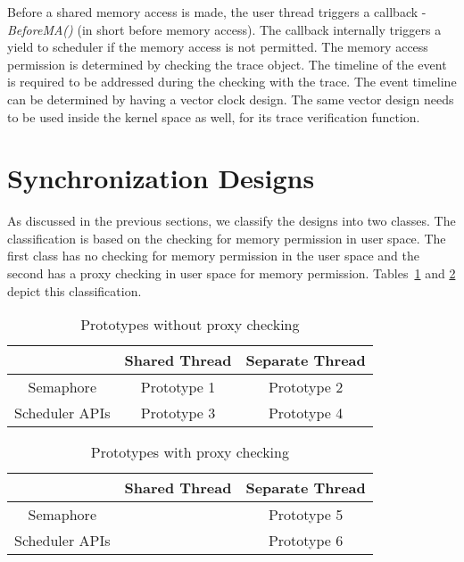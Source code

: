Before a shared memory access is made, the user thread triggers a callback - \emph{BeforeMA()} (in short before memory access). 
The callback internally triggers a yield to scheduler if the memory access is not permitted. 
The memory access permission is determined by checking the trace object. 
The timeline of the event is required to be addressed during the checking with the trace. 
The event timeline can be determined by having a vector clock design. 
The same vector design needs to be used inside the kernel space as well, for its trace verification function.



\section{Synchronization Designs \label{sync_des}}

As discussed in the previous sections, we classify the designs into two classes. 
The classification is based on the checking for memory permission in user space. 
The first class has no checking for memory permission in the user space and the second has a proxy checking in user space for memory permission. 
Tables~\ref{protos_without_proxy} and \ref{protos_with_proxy} depict this classification.

\begin{table}[h]
\begin{center}
 \begin{tabular}{|c c c|} 
 \hline
 & Shared Thread & Separate Thread\\ %
 \hline
Semaphore & Prototype 1 & Prototype 2\\
Scheduler APIs & Prototype 3 & Prototype 4\\
\hline
\end{tabular}
\end{center}
\caption{Prototypes without proxy checking}
\label{protos_without_proxy}
\end{table}

\begin{table}[h]
\begin{center}
 \begin{tabular}{|c c c|} 
 \hline
 & Shared Thread & Separate Thread\\ %
 \hline
Semaphore &  & Prototype 5\\
Scheduler APIs &  & Prototype 6\\
\hline
\end{tabular}
\end{center}
\caption{Prototypes with proxy checking}
\label{protos_with_proxy}
\end{table}

